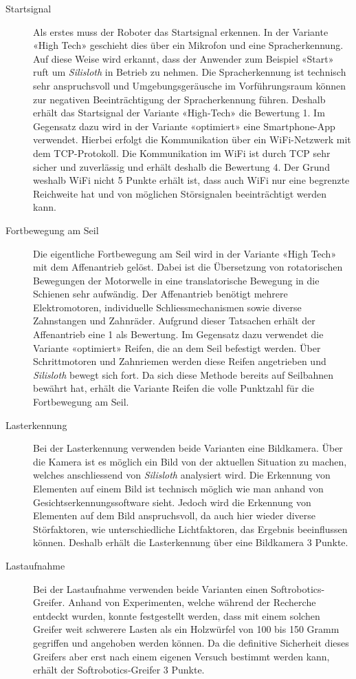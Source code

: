 \documentclass[a4paper,11pt]{scrartcl}
\begin{document}
\begin{description}
    \item [Startsignal] Als erstes muss der Roboter das Startsignal erkennen. In der Variante «High Tech» geschieht dies über ein Mikrofon und eine Spracherkennung. Auf diese Weise wird erkannt, dass der Anwender zum Beispiel «Start» ruft um \textit{Silisloth} in Betrieb zu nehmen. Die Spracherkennung ist technisch sehr anspruchsvoll und Umgebungsgeräusche im Vorführungsraum können zur negativen Beeinträchtigung der Spracherkennung führen. Deshalb erhält das Startsignal der Variante «High-Tech» die Bewertung 1. Im Gegensatz dazu wird in der Variante «optimiert» eine Smartphone-App verwendet. Hierbei erfolgt die Kommunikation über ein WiFi-Netzwerk mit dem TCP-Protokoll. Die Kommunikation im WiFi ist durch TCP sehr sicher und zuverlässig und erhält deshalb die Bewertung 4. Der Grund weshalb WiFi nicht 5 Punkte erhält ist, dass auch WiFi nur eine begrenzte Reichweite hat und von möglichen Störsignalen beeinträchtigt werden kann. 
    \item [Fortbewegung am Seil] Die eigentliche Fortbewegung am Seil wird in der Variante «High Tech» mit dem Affenantrieb gelöst. Dabei ist die Übersetzung von rotatorischen Bewegungen der Motorwelle in eine translatorische Bewegung in die Schienen sehr aufwändig. Der Affenantrieb benötigt mehrere Elektromotoren, individuelle Schliessmechanismen sowie diverse Zahnstangen und Zahnräder. Aufgrund dieser Tatsachen erhält der Affenantrieb eine 1 als Bewertung. Im Gegensatz dazu verwendet die Variante «optimiert» Reifen, die an dem Seil befestigt werden. Über Schrittmotoren und Zahnriemen werden diese Reifen angetrieben und \textit{Silisloth} bewegt sich fort. Da sich diese Methode bereits auf Seilbahnen bewährt hat, erhält die Variante Reifen die volle Punktzahl für die Fortbewegung am Seil.
    \item [Lasterkennung] Bei der Lasterkennung verwenden beide Varianten eine Bildkamera. Über die Kamera ist es möglich ein Bild von der aktuellen Situation zu machen, welches anschliessend von \textit{Silisloth} analysiert wird. Die Erkennung von Elementen auf einem Bild ist technisch möglich wie man anhand von Gesichtserkennungssoftware sieht. Jedoch wird die Erkennung von Elementen auf dem Bild anspruchsvoll, da auch hier wieder diverse Störfaktoren, wie unterschiedliche Lichtfaktoren, das Ergebnis beeinflussen können. Deshalb erhält die Lasterkennung über eine Bildkamera 3 Punkte.
    \item [Lastaufnahme] Bei der Lastaufnahme verwenden beide Varianten einen Softrobotics-Greifer. Anhand von Experimenten, welche während der Recherche entdeckt wurden, konnte festgestellt werden, dass mit einem solchen Greifer weit schwerere Lasten als ein Holzwürfel von 100 bis 150 Gramm gegriffen und angehoben werden können. Da die definitive Sicherheit dieses Greifers aber erst nach einem eigenen Versuch bestimmt werden kann, erhält der Softrobotics-Greifer 3 Punkte. 

\end{description}
\end{document}
